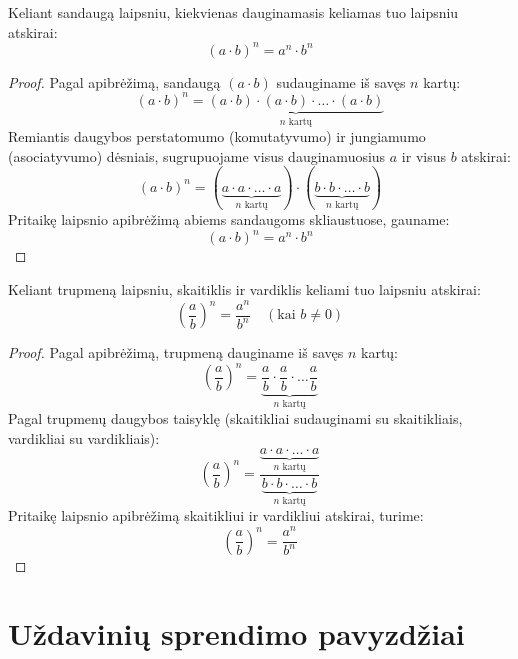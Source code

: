 \documentclass[11pt,a4paper]{scrartcl}
\begin{document}
\begin{property}
Keliant sandaugą laipsniu, kiekvienas dauginamasis keliamas tuo laipsniu atskirai:
$$(a \cdot b)^n = a^n \cdot b^n$$
\end{property}
\begin{proof}
Pagal apibrėžimą, sandaugą $(a \cdot b)$ sudauginame iš savęs $n$ kartų:
$$(a \cdot b)^n = \underbrace{(a \cdot b) \cdot (a \cdot b) \cdot \dots \cdot (a \cdot b)}_{n \text{ kartų}}$$
Remiantis daugybos perstatomumo (komutatyvumo) ir jungiamumo (asociatyvumo) dėsniais, sugrupuojame visus dauginamuosius $a$ ir visus $b$ atskirai:
$$(a \cdot b)^n = (\underbrace{a \cdot a \cdot \dots \cdot a}_{n \text{ kartų}}) \cdot (\underbrace{b \cdot b \cdot \dots \cdot b}_{n \text{ kartų}})$$
Pritaikę laipsnio apibrėžimą abiems sandaugoms skliaustuose, gauname:
$$(a \cdot b)^n = a^n \cdot b^n$$
\end{proof}
\begin{property}
Keliant trupmeną laipsniu, skaitiklis ir vardiklis keliami tuo laipsniu atskirai:
$$\left(\frac{a}{b}\right)^n = \frac{a^n}{b^n} \quad (\text{kai } b \neq 0)$$
\end{property}
\begin{proof}
Pagal apibrėžimą, trupmeną dauginame iš savęs $n$ kartų:
$$\left(\frac{a}{b}\right)^n = \underbrace{\frac{a}{b} \cdot \frac{a}{b} \cdot \dots \frac{a}{b}}_{n \text{ kartų}}$$
Pagal trupmenų daugybos taisyklę (skaitikliai sudauginami su skaitikliais, vardikliai su vardikliais):
$$\left(\frac{a}{b}\right)^n = \frac{\underbrace{a \cdot a \cdot \dots \cdot a}_{n \text{ kartų}}}{\underbrace{b \cdot b \cdot \dots \cdot b}_{n \text{ kartų}}}$$
Pritaikę laipsnio apibrėžimą skaitikliui ir vardikliui atskirai, turime:
$$\left(\frac{a}{b}\right)^n = \frac{a^n}{b^n}$$
\end{proof}

\section{Uždavinių sprendimo pavyzdžiai}
\end{document}

